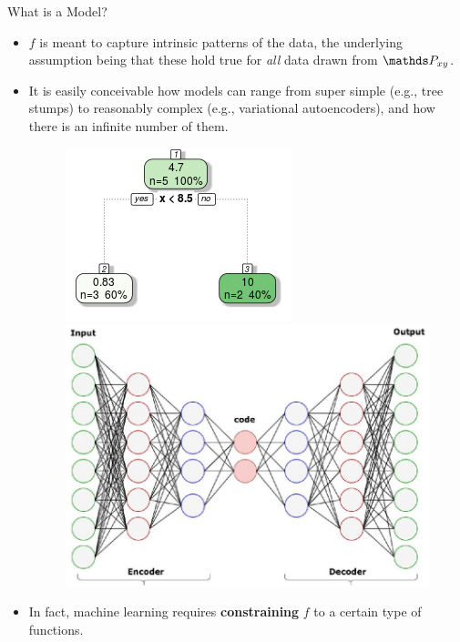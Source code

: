 \documentclass[11pt,compress,t,notes=noshow, xcolor=table]{beamer}
\begin{document}
\begin{vbframe}{What is a Model?}
\begin{itemize}

  \item $f$ is meant to capture intrinsic patterns of the data, the
  underlying assumption being that these hold true for \emph{all} data drawn 
  from $\Pxy$.
  
  \item It is easily conceivable how models can range from super simple (e.g.,
  tree stumps) to reasonably complex (e.g., variational autoencoders), and how 
  there is an infinite number of them.
  
  \begin{figure}
  \begin{minipage}{0.4\textwidth}
    \centering
    \includegraphics[width=0.8\linewidth]{figure_man/monotone_trafo1.png}
  \end{minipage}%
  \begin{minipage}{0.6\textwidth}
    \centering
    \includegraphics[width=0.6\linewidth]{figure_man/stacked_autoencoder.png}
  \end{minipage}
  \end{figure}
  
  \vspace{0.2cm}
  
  \item In fact, machine learning requires \textbf{constraining} $f$ to a 
  certain type of functions.

\end{itemize}

\end{vbframe}
\end{document}
